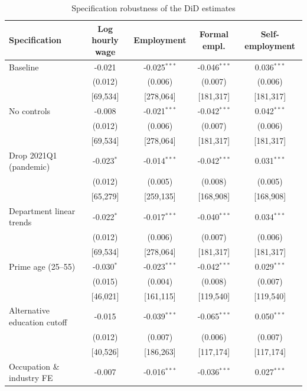 \begin{table}[!tbp]\centering
\caption{Specification robustness of the DiD estimates}\label{tab:robspec}
\begin{threeparttable}
\footnotesize
\begin{tabular}{lcccc}
\toprule
Specification & Log hourly wage & Employment & Formal empl. & Self-employment \\
\midrule
Baseline & -0.021 & -0.025$^{***}$ & -0.046$^{***}$ & 0.036$^{***}$ \\
 & (0.012) & (0.006) & (0.007) & (0.006) \\
 & \footnotesize[69,534] & \footnotesize[278,064] & \footnotesize[181,317] & \footnotesize[181,317] \\
No controls & -0.008 & -0.021$^{***}$ & -0.042$^{***}$ & 0.042$^{***}$ \\
 & (0.012) & (0.006) & (0.007) & (0.006) \\
 & \footnotesize[69,534] & \footnotesize[278,064] & \footnotesize[181,317] & \footnotesize[181,317] \\
Drop 2021Q1 (pandemic) & -0.023$^{*}$ & -0.014$^{***}$ & -0.042$^{***}$ & 0.031$^{***}$ \\
 & (0.012) & (0.005) & (0.008) & (0.005) \\
 & \footnotesize[65,279] & \footnotesize[259,135] & \footnotesize[168,908] & \footnotesize[168,908] \\
Department linear trends & -0.022$^{*}$ & -0.017$^{***}$ & -0.040$^{***}$ & 0.034$^{***}$ \\
 & (0.012) & (0.006) & (0.007) & (0.006) \\
 & \footnotesize[69,534] & \footnotesize[278,064] & \footnotesize[181,317] & \footnotesize[181,317] \\
Prime age (25--55) & -0.030$^{*}$ & -0.023$^{***}$ & -0.042$^{***}$ & 0.029$^{***}$ \\
 & (0.015) & (0.004) & (0.008) & (0.007) \\
 & \footnotesize[46,021] & \footnotesize[161,115] & \footnotesize[119,540] & \footnotesize[119,540] \\
Alternative education cutoff & -0.015 & -0.039$^{***}$ & -0.065$^{***}$ & 0.050$^{***}$ \\
 & (0.012) & (0.007) & (0.006) & (0.007) \\
 & \footnotesize[40,526] & \footnotesize[186,263] & \footnotesize[117,174] & \footnotesize[117,174] \\
Occupation \& industry FE & -0.007 & -0.016$^{***}$ & -0.036$^{***}$ & 0.027$^{***}$ \\

\end{tabular}
\end{threeparttable}
\end{table}
